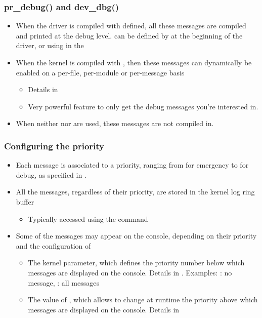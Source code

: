 \begin{frame}
  \frametitle{pr\_debug() and dev\_dbg()}
  \begin{itemize}
  \item When the driver is compiled with  defined, all
    these messages are compiled and printed at the debug level.
     can be defined by  at the
    beginning of the driver, or using
     in the 
  \item When the kernel is compiled with ,
    then these messages can dynamically be enabled on a per-file,
    per-module or per-message basis
    \begin{itemize}
    \item Details in 
    \item Very powerful feature to only get the debug messages you're
      interested in.
    \end{itemize}
  \item When neither  nor  are
    used, these messages are not compiled in.
  \end{itemize}
\end{frame}

\begin{frame}
  \frametitle{Configuring the priority}
  \begin{itemize}
  \item Each message is associated to a priority, ranging from  for
    emergency to  for debug, as specified in
    .
  \item All the messages, regardless of their priority, are stored in
    the kernel log ring buffer
    \begin{itemize}
    \item Typically accessed using the  command
    \end{itemize}
  \item Some of the messages may appear on the console, depending on
    their priority and the configuration of
    \begin{itemize}
    \item The  kernel parameter, which defines the
      priority number below which messages are displayed on the console.
      Details in .
      \newline Examples: : no message, : all messages
    \item The value of , which allows to
      change at runtime the priority above which messages are
      displayed on the console. Details in
    \end{itemize}
  \end{itemize}
\end{frame}

